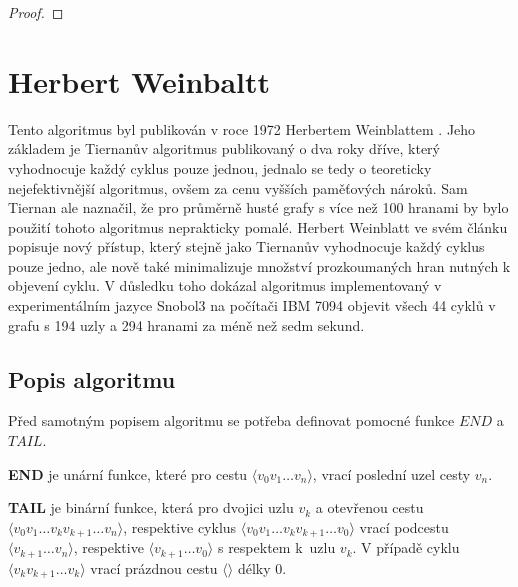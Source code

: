         \begin{proof}
            \lipsum[1]
        \end{proof}

\chapter{Herbert Weinbaltt}
    \label{chapter:Algo2}
    Tento algoritmus byl publikován v roce 1972 Herbertem Weinblattem \cite{A_new_search_algorithm}. Jeho základem je Tiernanův algoritmus \cite{Tiernan} publikovaný o dva roky dříve, který vyhodnocuje každý cyklus pouze jednou, jednalo se tedy o teoreticky nejefektivnější algoritmus, ovšem za cenu vyšších paměťových nároků. Sam Tiernan ale naznačil, že pro průměrně husté grafy s více než 100 hranami by bylo použití tohoto algoritmus neprakticky pomalé. Herbert Weinblatt ve svém článku popisuje nový přístup, který stejně jako Tiernanův vyhodnocuje každý cyklus pouze jedno, ale nově také minimalizuje množství prozkoumaných hran nutných k objevení cyklu. V důsledku toho dokázal algoritmus implementovaný v experimentálním jazyce Snobol3 na počítači IBM 7094 objevit všech 44 cyklů v grafu s 194 uzly a 294 hranami za méně než sedm sekund.

    \section{Popis algoritmu}
        Před samotným popisem algoritmu se potřeba definovat pomocné funkce $\mathit{END}$ a $\mathit{TAIL}$.

        \begin{definition}
            \label{def:end}
            \textbf{END} je unární funkce, které pro cestu $\langle v_0 v_1 \dots v_n \rangle$, vrací poslední uzel cesty $v_n$.
        \end{definition}

        \begin{definition}
            \textbf{TAIL} je binární funkce, která pro dvojici uzlu $v_k$ a otevřenou cestu $\langle v_0 v_1 \dots v_k v_{k+1} \dots v_n \rangle$, respektive cyklus $\langle v_0 v_1 \dots v_k v_{k+1} \dots v_0 \rangle$ vrací podcestu $\langle v_{k+1} \dots v_n \rangle$, respektive $\langle v_{k+1} \dots v_0 \rangle$ s respektem k~uzlu $v_k$. V případě cyklu $\langle v_k v_{k+1} \dots v_k \rangle$ vrací prázdnou cestu $\langle \rangle$ délky 0.\\
        \end{definition}

